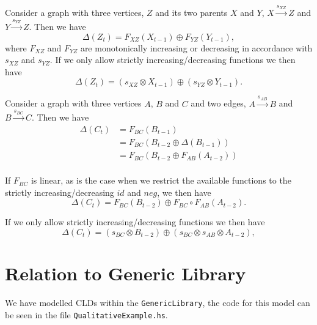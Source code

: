 \documentclass[a4paper,11pt]{article}
\begin{document}
Consider a graph with three vertices, $Z$ and its two parents
$X$ and $Y$, $X\xrightarrow{s_{XZ}} Z$ and $Y\xrightarrow{s_{YZ}} Z$.
%
Then we have
\[\Delta(Z_t) = F_{XZ}(X_{t-1}) \oplus F_{YZ}(Y_{t-1}),\]
where $F_{XZ}$ and $F_{YZ}$ are monotonically increasing or decreasing in
accordance with $s_{XZ}$ and $s_{YZ}$.
%
If we only allow strictly increasing/decreasing functions we then have
\[\Delta(Z_t) = (s_{XZ}\otimes X_{t-1})\oplus (s_{YZ}\otimes Y_{t-1}).\]

Consider a graph with three vertices $A$, $B$ and $C$ and two edges,
$A\xrightarrow{s_{AB}} B$ and $B\xrightarrow{s_{BC}} C$. Then we have
\begin{align*}
\Delta(C_t) &= F_{BC}(B_{t-1})\\
&= F_{BC}(B_{t-2} \oplus \Delta(B_{t-1}))\\
&= F_{BC}(B_{t-2}  \oplus F_{AB}(A_{t-2}))\\
\end{align*}

If $F_{BC}$ is linear, as is the case when we restrict the available functions
to the strictly increasing/decreasing $id$ and $neg$,
we then have
\[\Delta(C_t) = F_{BC}(B_{t-2})\oplus F_{BC}\circ F_{AB}(A_{t-2}).\]

If we only allow strictly increasing/decreasing functions we then have
\[\Delta(C_t) = (s_{BC}\otimes B_{t-2})\oplus (s_{BC}\otimes s_{AB}\otimes A_{t-2}),\]

\section{Relation to Generic Library}
We have modelled CLDs within the \verb|GenericLibrary|, the code for this model
can be seen in the file \verb|QualitativeExample.hs|. \\

\end{document}
